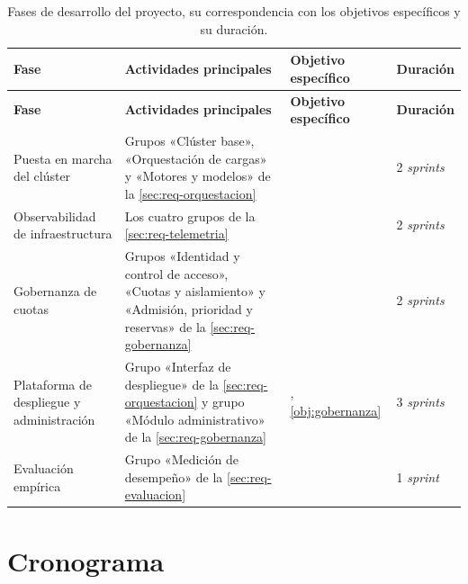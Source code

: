 \begin{xltabular}{\textwidth}{p{0.2\textwidth} X p{0.14\textwidth} p{0.11\textwidth}}
        \caption{Fases de desarrollo del proyecto, su correspondencia con los objetivos específicos y su duración.}
        \label{tab:fases-desarrollo} \\
        \toprule
        \textbf{Fase} & \textbf{Actividades principales} & \textbf{Objetivo específico} & \textbf{Duración} \\
        \midrule
        \endfirsthead
        \toprule
        \textbf{Fase} & \textbf{Actividades principales} & \textbf{Objetivo específico} & \textbf{Duración} \\
        \midrule
        \endhead
        \bottomrule
        \endfoot
        Puesta en marcha del clúster &
        Grupos «Clúster base», «Orquestación de cargas» y «Motores y modelos» de la \cref{sec:req-orquestacion} &
         & 2 \emph{sprints} \\
        \addlinespace
        Observabilidad de infraestructura &
        Los cuatro grupos de la \cref{sec:req-telemetria} &
         & 2 \emph{sprints} \\
        \addlinespace
        Gobernanza de cuotas &
        Grupos «Identidad y control de acceso», «Cuotas y aislamiento» y «Admisión, prioridad y reservas» de la \cref{sec:req-gobernanza} &
         & 2 \emph{sprints} \\
        \addlinespace
        Plataforma de despliegue y administración &
        Grupo «Interfaz de despliegue» de la \cref{sec:req-orquestacion} y grupo «Módulo administrativo» de la \cref{sec:req-gobernanza} &
        , \cref{obj:gobernanza} & 3 \emph{sprints} \\
        \addlinespace
        Evaluación empírica &
        Grupo «Medición de desempeño» de la \cref{sec:req-evaluacion} &
         & 1 \emph{sprint} \\
\end{xltabular}

\section{Cronograma}
\label{sec:cronograma}

